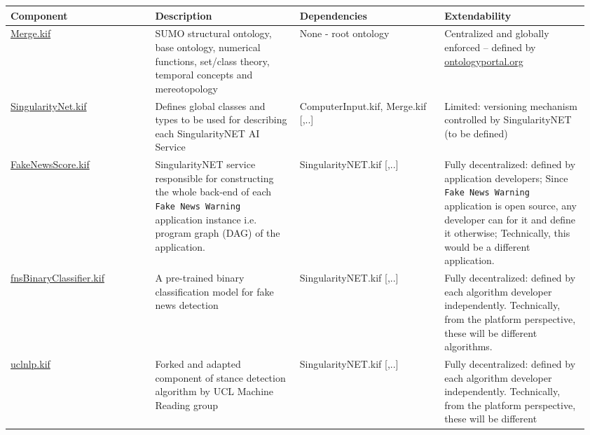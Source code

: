 \documentclass[]{report}
\begin{document}
\begin{table}[H]
  \scriptsize
  \centering
  \begin{tabular}{p{0.24\linewidth}|p{0.24\linewidth}|p{0.24\linewidth}|p{0.24\linewidth}|}
    \textbf{Component} &
    \textbf{Description} &
    \textbf{Dependencies} &
    \textbf{Extendability}\\
    \hline
    \href{https://github.com/ontologyportal/sumo/blob/master/Merge.kif}{Merge.kif} &
    SUMO structural ontology, base ontology, numerical functions, set/class theory, temporal concepts and mereotopology &
    None - root ontology &
    Centralized and globally enforced -- defined by \href{http://www.ontologyportal.org/}{ontologyportal.org} \\
    \hline
    \href{https://github.com/singnet/ai-dsl/blob/master/ontology/
    SingulairtyNet.kif}{SingularityNet.kif} &
    Defines global classes and types to be used for describing each
    SingularityNET AI Service &
    ComputerInput.kif, Merge.kif [,..]&
    Limited: versioning mechanism controlled by SingularityNET (to be defined)\\
    \hline
    \href{https://github.com/singnet/ai-dsl/blob/master/ontology/
    FakeNewsScore.kif}{FakeNewsScore.kif} &
    SingularityNET service responsible for constructing the whole back-end of
    each \texttt{Fake News Warning} application instance i.e. program graph
    (DAG) of the application.&
    SingularityNET.kif [,..] &
    Fully decentralized: defined by application developers; Since \texttt{Fake News
Warning} application is open source, any developer can for it and define it
otherwise; Technically, this would be a different application.\\
    \hline
    \href{https://github.com/singnet/ai-dsl/blob/master/ontology/fnsBinaryClassifier.kif}{fnsBinaryClassifier.kif} &
    A pre-trained binary classification model for fake news detection &
    SingularityNET.kif [,..] &
    Fully decentralized: defined by each algorithm developer independently.
    Technically, from the platform perspective, these will be different
    algorithms. \\
    \hline
    \href{https://github.com/singnet/ai-dsl/blob/master/ontology/
    uclnlp.kif}{uclnlp.kif} &
    Forked and adapted component of stance detection algorithm by UCL Machine Reading group &
    SingularityNET.kif [,..] &
    Fully decentralized: defined by each algorithm developer independently.
    Technically, from the platform perspective, these will be different

\end{tabular}
\end{table}
\end{document}
